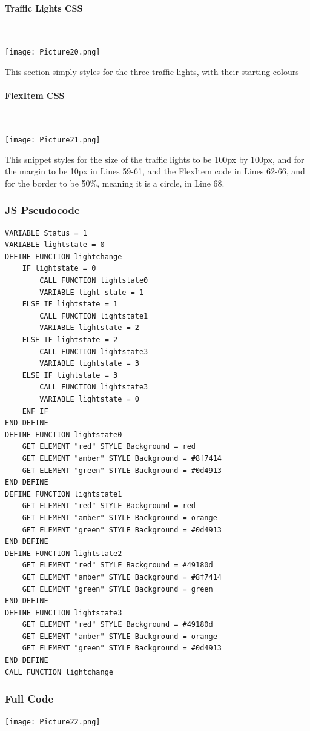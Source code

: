 \documentclass[a4paper]{article}
\begin{document}
\paragraph{Traffic Lights CSS}
~\par
\noindent\texttt{[image: Picture20.png]} \par
This section simply styles for the three traffic lights, with their starting colours
\paragraph{FlexItem CSS}
~\par
\noindent\texttt{[image: Picture21.png]} \par
This snippet styles for the size of the traffic lights to be 100px by 100px, and for the margin to be 10px in Lines 59-61, and the FlexItem code in Lines 62-66, and for the border to be 50\%, meaning it is a circle, in Line 68. \newpage
\subsubsection{JS Pseudocode}	
\begin{lstlisting}
VARIABLE Status = 1
VARIABLE lightstate = 0
DEFINE FUNCTION lightchange
	IF lightstate = 0
		CALL FUNCTION lightstate0
		VARIABLE light state = 1
	ELSE IF lightstate = 1
		CALL FUNCTION lightstate1
		VARIABLE lightstate = 2
	ELSE IF lightstate = 2
		CALL FUNCTION lightstate3
		VARIABLE lightstate = 3
	ELSE IF lightstate = 3
		CALL FUNCTION lightstate3
		VARIABLE lightstate = 0
	ENF IF
END DEFINE
DEFINE FUNCTION lightstate0
	GET ELEMENT "red" STYLE Background = red
	GET ELEMENT "amber" STYLE Background = #8f7414
	GET ELEMENT "green" STYLE Background = #0d4913
END DEFINE
DEFINE FUNCTION lightstate1
	GET ELEMENT "red" STYLE Background = red
	GET ELEMENT "amber" STYLE Background = orange
	GET ELEMENT "green" STYLE Background = #0d4913
END DEFINE
DEFINE FUNCTION lightstate2
	GET ELEMENT "red" STYLE Background = #49180d
	GET ELEMENT "amber" STYLE Background = #8f7414
	GET ELEMENT "green" STYLE Background = green
END DEFINE
DEFINE FUNCTION lightstate3
	GET ELEMENT "red" STYLE Background = #49180d
	GET ELEMENT "amber" STYLE Background = orange
	GET ELEMENT "green" STYLE Background = #0d4913
END DEFINE
CALL FUNCTION lightchange
\end{lstlisting}
\subsubsection{Full Code}
\noindent\texttt{[image: Picture22.png]} \par
\end{document}
